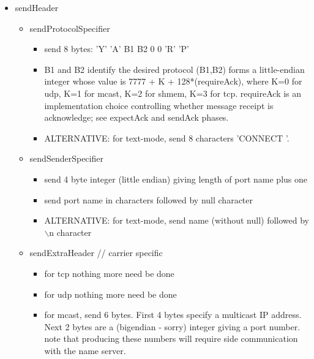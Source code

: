 \documentclass[a4]{article}
\begin{document}
\begin{itemize}

\item sendHeader
    
  \begin{itemize}

    \item sendProtocolSpecifier

      \begin{itemize}

      \item send 8 bytes: 'Y' 'A' B1 B2 0 0 'R' 'P'
      \item B1 and B2 identify the desired protocol
      (B1,B2) forms a little-endian integer whose value is
         7777 + K + 128*(requireAck),
      where K=0 for udp, K=1 for mcast, K=2 for shmem, K=3 for tcp.
      requireAck is an implementation choice controlling
      whether message receipt is acknowledge; see expectAck and sendAck
      phases.
    
      \item ALTERNATIVE: for text-mode, send 8 characters 'CONNECT '.
	
      \end{itemize}

    \item sendSenderSpecifier
      
      \begin{itemize}
      \item send 4 byte integer (little endian) giving length of port
      name plus one
      \item send port name in characters followed by null character
      \item ALTERNATIVE: for text-mode, send name (without null)
      followed by $\backslash$n character
      \end{itemize}

    \item sendExtraHeader      // carrier specific
      \begin{itemize}
	\item for tcp nothing more need be done
	\item for udp nothing more need be done
	\item for mcast, send 6 bytes.
         First 4 bytes specify a multicast IP address.
	 Next 2 bytes are a (bigendian - sorry) integer giving a port number.
         note that producing these numbers will require side communication
         with the name server.
      \end{itemize}
  \end{itemize}


\end{itemize}
\end{document}
